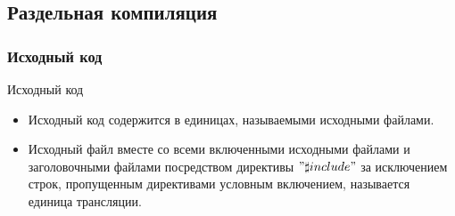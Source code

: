 \documentclass[xetex,mathserif,serif,10pt]{beamer}
\begin{document}
    \subsection{Раздельная компиляция}
    \subsubsection{Исходный код}
    \begin{frame}{Исходный код}
        \begin{itemize}
            \item Исходный код содержится в единицах, называемыми исходными файлами.
            \item Исходный файл вместе со всеми включенными исходными файлами и заголовочными файлами посредством директивы $"\sharp{include}"$
                за исключением строк, пропущенным директивами условным включением, называется единица трансляции.
        \end{itemize}
    \end{frame}
\end{document}
